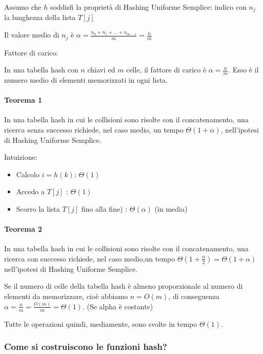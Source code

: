 \documentclass{article}
\providecommand{\tightlist}{%
  \setlength{\itemsep}{0pt}\setlength{\parskip}{0pt}}
\let\oldparagraph\paragraph
\renewcommand{\paragraph}[1]{\oldparagraph{#1}\mbox{}}
\begin{document}
{Assumo che $h$ soddisfi la proprietà di Hashing Uniforme Semplice: indico con $n_j$ la lunghezza della lista $T[j]$}

{Il valore medio di $n_j$ è $\alpha=\frac{n_0+n_1+\ldots+n_{m-1}}{m}=\frac{n}{m}$}

{Fattore di carico: }

{In una tabella hash con $n$ chiavi ed $m$ celle, il fattore di carico è $\alpha = \frac{n}{m}$. Esso è il numero medio di elementi memorizzati in ogni lista.}

\paragraph{Teorema 1}

{In una tabella hash in cui le collisioni sono risolte con il concatenamento, una ricerca senza successo richiede, nel caso medio, un tempo $\Theta(1+\alpha)$, nell'ipotesi di Hashing Uniforme Semplice.}

{Intuizione:}

\begin{itemize}
\tightlist
\item
  {Calcolo $i=h(k)$: $\Theta(1)$}
\item
  {Accedo a $T[j]$ : $\Theta(1)$}
\item
  {Scorro la lista $T[j]$ fino alla fine) : $\Theta(\alpha)$ (in media)}
\end{itemize}

\paragraph{Teorema 2}

{In una tabella hash in cui le collisioni sono risolte con il concatenamento, una ricerca con successo richiede, nel caso medio,un tempo $\Theta(1+\frac{\alpha}{2}) = \Theta(1+\alpha)$ nell'ipotesi di Hashing Uniforme Semplice.}

{Se il numero di celle della tabella hash è almeno proporzionale al numero di elementi da memorizzare, cioè abbiamo $n=O(m)$, di conseguenza \\ $\alpha=\frac{n}{m} = \frac{O(m)}{m}=\Theta(1)$. (Se alpha è costante) }

Tutte le operazioni quindi, mediamente, sono svolte in tempo $\Theta(1)$.


\subsubsection{Come si costruiscono le funzioni hash?}
\end{document}
